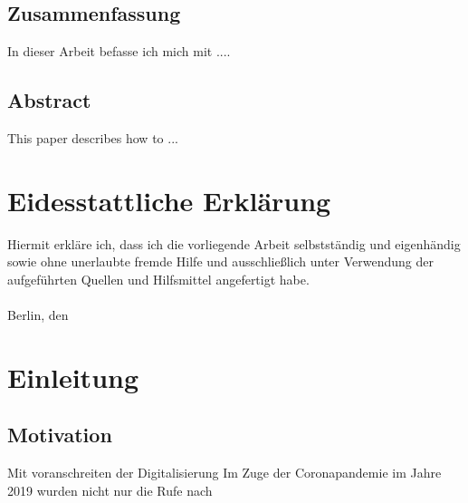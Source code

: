 \makeatother

\newcommand\ProcessThreeDashes{\llap{\color{cyan}\mdseries-{-}-}}




    \nocite{*}



    \frontmatter
    
    \hypersetup{pageanchor=false}

    \newpage
    \section*{Zusammenfassung}
    In dieser Arbeit befasse ich mich mit ....

    \section*{Abstract}\label{sec:abstract}
    This paper describes how to ...
    \newpage
    \chapter*{Eidesstattliche Erklärung}\label{ch:eidesstattliche-erklarung}
    Hiermit erkläre ich, dass ich die vorliegende Arbeit selbstständig und eigenhändig sowie ohne
    unerlaubte fremde Hilfe und ausschließlich unter Verwendung der aufgeführten Quellen und
    Hilfsmittel angefertigt habe.\\
    \vspace{1cm}\\
    Berlin, den \underline{\hspace{3cm}} \hfill \DeinName \underline{\hspace{4cm}}

    \newpage
    \tableofcontents

    \mainmatter

    \newpage
    \chapter{Einleitung}\label{ch:einleitung}

    \section{Motivation}\label{sec:motivation}
    Mit voranschreiten der Digitalisierung
    Im Zuge der Coronapandemie im Jahre 2019 wurden nicht nur die Rufe nach

